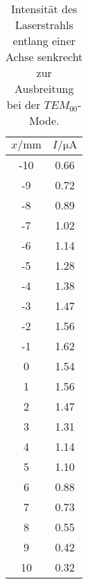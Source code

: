 \begin{table}
    \centering
    \caption{Intensität des Laserstrahls entlang einer Achse senkrecht zur Ausbreitung bei der $TEM_{00}$-Mode.}
    \label{tab:mode00_data}
    \begin{tabular}{c c}
        \toprule
        $x/\si{\milli\meter}$ & $I/\si{\micro\ampere} $ \\
        \midrule
        -10& 0.66\\
        -9 & 0.72\\
        -8 & 0.89\\
        -7 & 1.02\\
        -6 & 1.14\\
        -5 & 1.28\\
        -4 & 1.38\\
        -3 & 1.47\\
        -2 & 1.56\\
        -1 & 1.62\\
        0  & 1.54\\
        1  & 1.56\\
        2  & 1.47\\
        3  & 1.31\\
        4  & 1.14\\
        5  & 1.10\\
        6  & 0.88\\
        7  & 0.73\\
        8  & 0.55\\
        9  & 0.42\\
        10 & 0.32\\
        \bottomrule
    \end{tabular}
\end{table}

